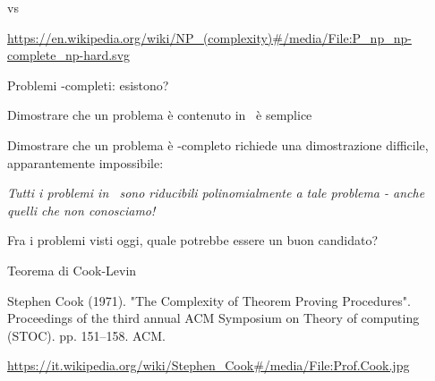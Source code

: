 \begin{frame}{\PTIME vs \NP}

\vspace{-6pt}

\tiny
\url{https://en.wikipedia.org/wiki/NP\_(complexity)\#/media/File:P\_np\_np-complete\_np-hard.svg}

\end{frame}

\begin{frame}{Problemi \NP-completi: esistono?}

\BIL
\item Dimostrare che un problema è contenuto in \NP\ è semplice
\item Dimostrare che un problema è \NP-completo richiede una dimostrazione difficile, apparantemente impossibile:

\bigskip
\emph{Tutti i problemi in \NP\ sono riducibili polinomialmente a tale problema - anche quelli che non conosciamo!}
\EIL

\bigskip
Fra i problemi visti oggi, quale potrebbe essere un buon candidato?

\end{frame}

\begin{frame}{Teorema di Cook-Levin}

\vspace{-9pt}
\begin{myboxtitle}[Bibliografia]
Stephen Cook (1971). "The Complexity of Theorem Proving Procedures". Proceedings of the third annual ACM Symposium on Theory of computing (STOC). pp. 151–158. ACM.
\end{myboxtitle}

\vspace{-6pt}

\bigskip
\tiny
\url{https://it.wikipedia.org/wiki/Stephen\_Cook\#/media/File:Prof.Cook.jpg}

\end{frame}

